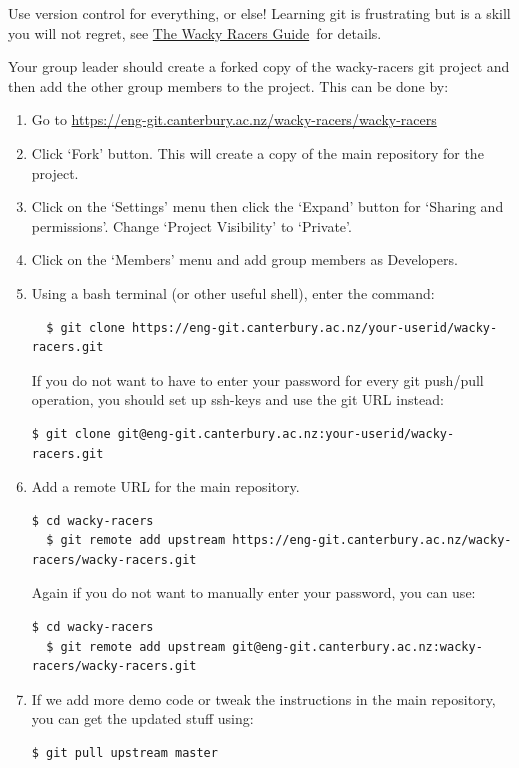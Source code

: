 \documentclass[11pt, a4paper]{article}
\newcommand{\theguide}{\href{https://eng-git.canterbury.ac.nz/wacky-racers/wacky-racers/-/blob/master/doc/guide/guide.pdf}{The Wacky Racers Guide}}
\begin{document}
Use version control for everything, or else!  Learning git is
frustrating but is a skill you will not regret, see \theguide\ for
details.

Your group leader should create a forked copy of the wacky-racers git project
and then add the other group members to the project.  This can be done by:

\begin{enumerate}
\item Go to \url{https://eng-git.canterbury.ac.nz/wacky-racers/wacky-racers}

\item Click `Fork' button.  This will create a copy of the main repository for the project.

\item Click on the `Settings' menu then click the `Expand' button for
`Sharing and permissions'.  Change `Project Visibility' to `Private'.

\item Click on the `Members' menu and add group members as Developers.

\item Using a bash terminal (or other useful shell), enter the command:

\lstset{language=bash}
\lstset{basicstyle=\ttfamily\small}
\lstset{breaklines}

\begin{lstlisting}
  $ git clone https://eng-git.canterbury.ac.nz/your-userid/wacky-racers.git
\end{lstlisting}

If you do not want to have to enter your password for every git
push/pull operation, you should set up ssh-keys and use the git URL instead:

\begin{lstlisting}[breaklines]
  $ git clone git@eng-git.canterbury.ac.nz:your-userid/wacky-racers.git
\end{lstlisting}

\item Add a remote URL for the main repository.
%
\begin{lstlisting}[breaklines]
  $ cd wacky-racers
  $ git remote add upstream https://eng-git.canterbury.ac.nz/wacky-racers/wacky-racers.git
\end{lstlisting}
%
Again if you do not want to manually enter your password, you can use:
%
\begin{lstlisting}[breaklines]
  $ cd wacky-racers
  $ git remote add upstream git@eng-git.canterbury.ac.nz:wacky-racers/wacky-racers.git
\end{lstlisting}

\item If we add more demo code or tweak the instructions in the main
repository, you can get the updated stuff using:
%
\begin{lstlisting}[breaklines]
  $ git pull upstream master
\end{lstlisting}
\end{enumerate}
\end{document}
